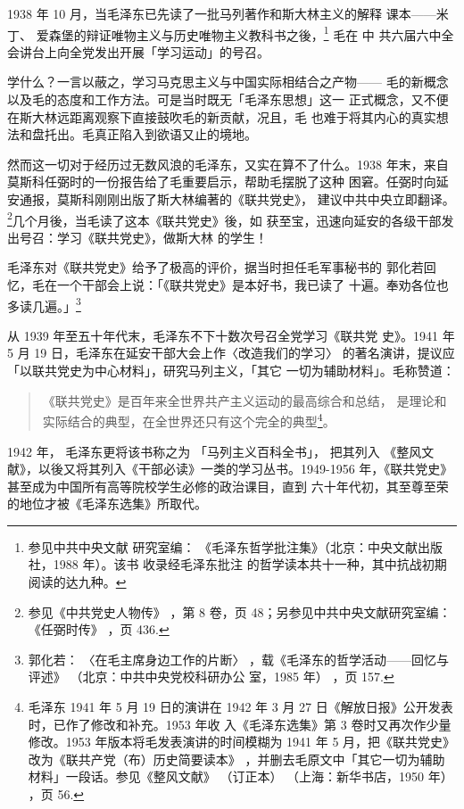 1938 年 10 月，当毛泽东已先读了一批马列著作和斯大林主义的解释 课本——米丁、
爱森堡的辩证唯物主义与历史唯物主义教科书之後，\footnote{参见中共中央文献
研究室编： 《毛泽东哲学批注集》（北京：中央文献出版社，1988 年）。该书
收录经毛泽东批注 的哲学读本共十一种，其中抗战初期阅读的达九种。} 毛在 中
共六届六中全会讲台上向全党发出开展「学习运动」的号召。

学什么？一言以蔽之，学习马克思主义与中国实际相结合之产物——
毛的新概念以及毛的态度和工作方法。可是当时既无「毛泽东思想」这一
正式概念，又不便在斯大林远距离观察下直接鼓吹毛的新贡献，况且，毛
也难于将其内心的真实想法和盘托出。毛真正陷入到欲语又止的境地。

然而这一切对于经历过无数风浪的毛泽东，又实在算不了什么。1938
年末，来自莫斯科任弼时的一份报告给了毛重要启示，帮助毛摆脱了这种
困窘。任弼时向延安通报，莫斯科刚刚出版了斯大林编著的《联共党史》，
建议中共中央立即翻译。\footnote{参见《中共党史人物传》
，第 8 卷，页 48；另参见中共中央文献研究室编：
《任弼时传》
，页 436.}几个月後，当毛读了这本《联共党史》後，如
获至宝，迅速向延安的各级干部发出号召：学习《联共党史》，做斯大林
的学生！

毛泽东对《联共党史》给予了极高的评价，据当时担任毛军事秘书的
郭化若回忆，毛在一个干部会上说：「《联共党史》是本好书，我已读了
十遍。奉劝各位也多读几遍。」\footnote{郭化若：
〈在毛主席身边工作的片断〉
，载《毛泽东的哲学活动——回忆与评述》
（北京：中共中央党校科研办公
室，1985 年）
，页 157.}

从 1939 年至五十年代末，毛泽东不下十数次号召全党学习《联共党
史》。1941 年 5 月 19 日，毛泽东在延安干部大会上作〈改造我们的学习〉
的著名演讲，提议应「以联共党史为中心材料」，研究马列主义，「其它
一切为辅助材料」。毛称赞道：
\begin{quote}
	\fzwkai 《联共党史》是百年来全世界共产主义运动的最高综合和总结，
	是理论和实际结合的典型，在全世界还只有这个完全的典型\footnote{毛泽东 1941 年 5 月 19 日的演讲在 1942 年 3 月 27 日《解放日报》公开发表时，已作了修改和补充。1953 年收
入《毛泽东选集》第 3 卷时又再次作少量修改。1953 年版本将毛发表演讲的时间模糊为 1941 年 5 月，把《联共党史》
改为《联共产党（布）历史简要读本》
，并删去毛原文中「其它一切为辅助材料」一段话。参见《整风文献》
（订正本）
（上海：新华书店，1950 年）
，页 56.}。
\end{quote}


1942 年，
毛泽东更将该书称之为
「马列主义百科全书」， 把其列入
《整风文献》，以後又将其列入《干部必读》一类的学习丛书。1949-1956
年，《联共党史》甚至成为中国所有高等院校学生必修的政治课目，直到
六十年代初，其至尊至荣的地位才被《毛泽东选集》所取代。


